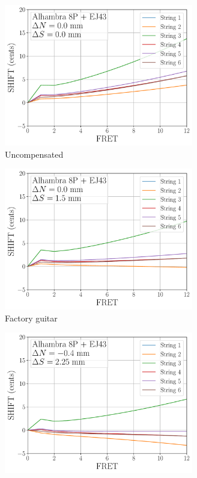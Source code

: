  \begin{figure}
  \centering
  \begin{subfigure}[b]{0.45\textwidth}
   \centering
   \includegraphics[width=3.25in]{figures/shift_alhambra8p_ej43_null}
   \caption{Uncompensated}
   \label{fig:shift_alhambra8p_ej43_null}
  \end{subfigure}
  \hspace{0.25in}
  \begin{subfigure}[b]{0.45\textwidth}
   \centering
   \includegraphics[width=3.25in]{figures/shift_alhambra8p_ej43_factory}
   \caption{Factory guitar}
   \label{fig:shift_alhambra8p_ej43_factory}
  \end{subfigure}
  \par\vspace{0.25in}
  \begin{subfigure}[b]{0.45\textwidth}
   \centering
   \includegraphics[width=3.25in]{figures/shift_alhambra8p_ej43_mean}

\end{subfigure}
\end{figure}
